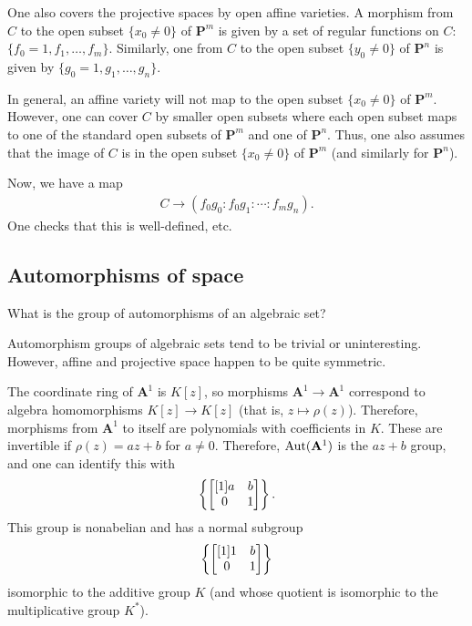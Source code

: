 \documentclass [11 pt, oneside] {article}
\begin{document}
One also covers the projective spaces by open affine varieties. A morphism from $C$ to the open subset $\{x_0\ne 0\}$ of $\mathbf{P}^m$ is given by a set of regular functions on $C$: $\{f_0=1,f_1,\hdots, f_m\}$. Similarly, one from $C$ to the open subset $\{y_0\ne 0\}$ of $\mathbf{P}^n$ is given by $\{g_0=1,g_1,\hdots, g_n\}$. 

In general, an affine variety will not map to the open subset $\{x_0\ne 0\}$ of $\mathbf{P}^m$. However, one can cover $C$ by smaller open subsets where each open subset maps to one of the standard open subsets of $\mathbf{P}^m$ and one of $\mathbf{P}^n$. Thus, one also assumes that the image of $C$ is in the open subset $\{x_0\ne 0\}$ of $\mathbf{P}^m$ (and similarly for $\mathbf{P}^n$).

Now, we have a map 
\begin{align*}
	C\longrightarrow (f_0g_0:f_0g_1:\cdots:f_mg_n).
\end{align*}
One checks that this is well-defined, etc.

\subsection{Automorphisms of space}
\begin{problem}
	What is the group of automorphisms of an algebraic set?
\end{problem}

Automorphism groups of algebraic sets tend to be trivial or uninteresting. However, affine and projective space happen to be quite symmetric.

\begin{example}\label{}
The coordinate ring of $\mathbf{A}^1$ is $K[z]$, so morphisms $\mathbf{A}^1\longrightarrow \mathbf{A}^1$ correspond to algebra homomorphisms $K[z]\longrightarrow K[z]$ (that is, $z\longmapsto \rho(z)$). Therefore, morphisms from $\mathbf{A}^1$ to itself are polynomials with coefficients in $K$. These are invertible if $\rho(z) = az+b$ for $a\ne 0$. Therefore, $\operatorname{Aut}(\mathbf{A}^1)$ is the $az+b$ group, and one can identify this with
\begin{align*}
	\left\{ \begin{bmatrix} [1] a&b\\0&1\end{bmatrix} \right\}. 
\end{align*}
This group is nonabelian and has a normal subgroup 
\begin{align*}
	\left\{\begin{bmatrix} [1]  1&b\\0&1\end{bmatrix} \right\} 
\end{align*}
isomorphic to the additive group $K$ (and whose quotient is isomorphic to the multiplicative group $K^*$).
\end{example}
\end{document}
